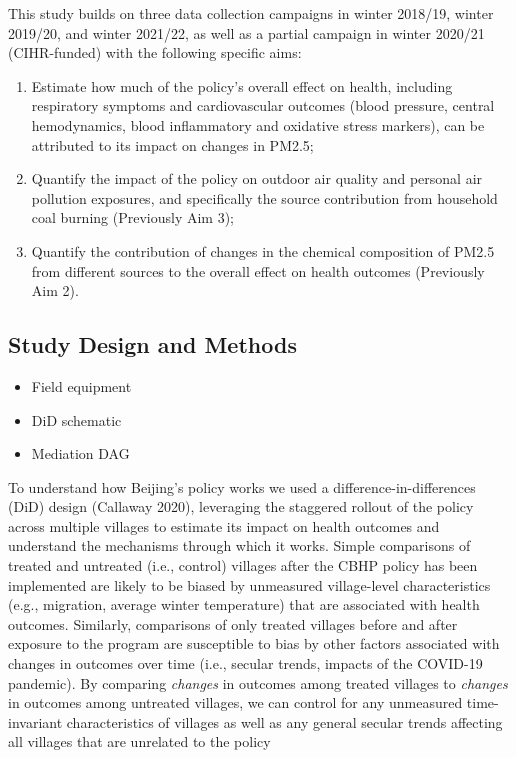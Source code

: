 \documentclass[
  letterpaper,
  DIV=11,
  numbers=noendperiod]{scrartcl}
\providecommand{\tightlist}{%
  \setlength{\itemsep}{0pt}\setlength{\parskip}{0pt}}\usepackage{longtable,booktabs,array}
\begin{document}
This study builds on three data collection campaigns in winter 2018/19,
winter 2019/20, and winter 2021/22, as well as a partial campaign in
winter 2020/21 (CIHR-funded) with the following specific aims:

\begin{enumerate}
\def\labelenumi{\arabic{enumi}.}
\item
  Estimate how much of the policy's overall effect on health, including
  respiratory symptoms and cardiovascular outcomes (blood pressure,
  central hemodynamics, blood inflammatory and oxidative stress
  markers), can be attributed to its impact on changes in PM2.5;
\item
  Quantify the impact of the policy on outdoor air quality and personal
  air pollution exposures, and specifically the source contribution from
  household coal burning (Previously Aim 3);
\item
  Quantify the contribution of changes in the chemical composition of
  PM2.5 from different sources to the overall effect on health outcomes
  (Previously Aim 2).
\end{enumerate}

\hypertarget{study-design-and-methods}{%
\subsection{Study Design and Methods}\label{study-design-and-methods}}

\begin{itemize}
\tightlist
\item
  Field equipment
\item
  DiD schematic
\item
  Mediation DAG
\end{itemize}

To understand how Beijing's policy works we used a
difference-in-differences (DiD) design (Callaway 2020), leveraging the
staggered rollout of the policy across multiple villages to estimate its
impact on health outcomes and understand the mechanisms through which it
works. Simple comparisons of treated and untreated (i.e., control)
villages after the CBHP policy has been implemented are likely to be
biased by unmeasured village-level characteristics (e.g., migration,
average winter temperature) that are associated with health outcomes.
Similarly, comparisons of only treated villages before and after
exposure to the program are susceptible to bias by other factors
associated with changes in outcomes over time (i.e., secular trends,
impacts of the COVID-19 pandemic). By comparing \emph{changes} in
outcomes among treated villages to \emph{changes} in outcomes among
untreated villages, we can control for any unmeasured time-invariant
characteristics of villages as well as any general secular trends
affecting all villages that are unrelated to the policy
\end{document}
